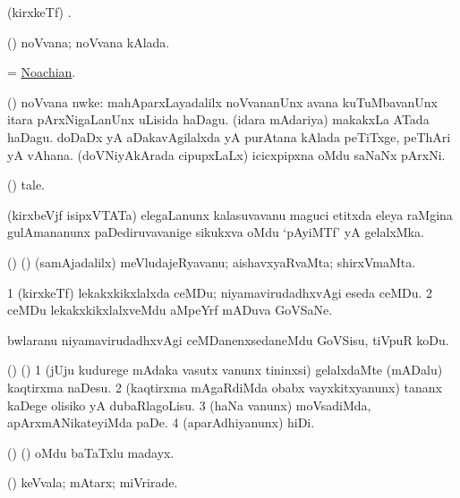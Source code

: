 \bentry
{}
\gl{\saMkiSx}
\bmng
(kirxkeTf) . 
\emng
\eentry

\bentry
{}
\gl{\gu}
\bmng
(\beY) noVvana; noVvana kAlada. 
\emng
\eentry

\bentry
{}
\gl{\gu}
\bmng
= \hyperlink{Noachian}{Noachian}. 
\emng
\eentry

\bentry
{}
\gl{\nA}
\bmng
(\beY) noVvana nwke: 
\banum
{} mahAparxLayadalilx noVvananUnx avana kuTuMbavanUnx itara pArxNigaLanUnx uLisida haDagu. 
 (idara mAdariya) makakxLa ATada haDagu. 
 doDaDx yA aDakavAgilalxda yA purAtana kAlada peTiTxge, peThAri yA vAhana. 
 (doVNiyAkArada cipupxLaLx) icicxpipxna oMdu saNaNx pArxNi. 
\eanum
\emng
\eentry

\bentry
{}
\gl{\nA}
\bmng
(\ashi) tale. 
\emng

\noindent
\gl{\pagu}
\bmng
{}(kirxbeVjf isipxVTATa) elegaLanunx kalasuvavanu maguci etitxda eleya raMgina gulAmananunx paDediruvavanige sikukxva oMdu `pAyiMTf' yA gelalxMka. 
\emng
\eentry

\bentry
{}
\gl{\nA}
\bmng
(\birx) (\ashi) (samAjadalilx) meVludajeRyavanu; aishavxyaRvaMta; shirxVmaMta. 
\emng
\eentry

\bentry
{}
\gl{\nA}
\bmng
\bnum
\num{1} (kirxkeTf) lekakxkikxlalxda ceMDu; niyamavirudadhxvAgi eseda ceMDu. 
\num{2} ceMDu lekakxkikxlalxveMdu aMpeYrf mADuva GoVSaNe. 
\enum
\emng
\eentry

\bentry
{}
\gl{\sakirx}
\bmng
bwlaranu niyamavirudadhxvAgi ceMDanenxsedaneMdu GoVSisu, tiVpuR koDu. 
\emng
\eentry

\bentry
{}
\gl{\sakirx}
\bmng
(\birx) (\ashi) 
\bnum
\num{1} (jUju kudurege mAdaka vasutx \mo vanunx tininxsi) gelalxdaMte (mADalu) kaqtirxma naDesu. 
\num{2} (kaqtirxma mAgaRdiMda obabx vayxkitxyanunx) tananx kaDege olisiko yA dubaRlagoLisu. 
\num{3} (haNa \mo vanunx) moVsadiMda, apArxmANikateyiMda paDe. 
\num{4} (aparAdhiyanunx) hiDi. 
\enum
\emng
\eentry

\bentry
{}
\gl{\nA}
\bmng
(\AseTxrXV) (\ashi) oMdu baTaTxlu madayx. 
\emng
\eentry

\bentry
{}
\gl{\kirxvi}
\bmng
(\pArxM) keVvala; mAtarx; miVrirade. 
\emng
\eentry

